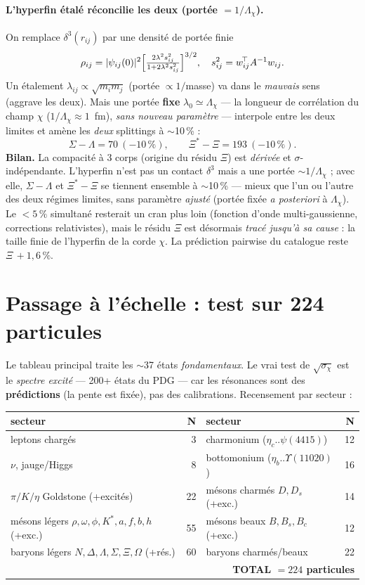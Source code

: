 \documentclass[11pt]{article}
\begin{document}
\paragraph{L'hyperfin étalé réconcilie les deux (portée $=1/\Lambda_\chi$).} On remplace $\delta^3(r_{ij})$ par une densité de portée finie
\[
\rho_{ij}=|\psi_{ij}(0)|^2\Bigl[\tfrac{2\lambda^2 s_{ij}^2}{1+2\lambda^2 s_{ij}^2}\Bigr]^{3/2},\quad s_{ij}^2=w_{ij}^{\!\top}A^{-1}w_{ij}.
\]
Un étalement $\lambda_{ij}\propto\sqrt{m_im_j}$ (portée $\propto1/$masse) va dans le \emph{mauvais} sens (aggrave les deux). Mais une portée \textbf{fixe} $\lambda_0\simeq\Lambda_\chi$ --- la longueur de corrélation du champ $\chi$ ($1/\Lambda_\chi\approx1$~fm), \emph{sans nouveau paramètre} --- interpole entre les deux limites et amène les \emph{deux} splittings à $\sim$10\,\% :
\[
\Sigma{-}\Lambda=70~(-10\,\%),\qquad \Xi^*{-}\Xi=193~(-10\,\%).
\]
\textbf{Bilan.} La compacité à 3 corps (origine du résidu $\Xi$) est \emph{dérivée} et $\sigma$-indépendante. L'hyperfin n'est pas un contact $\delta^3$ mais a une portée $\sim1/\Lambda_\chi$ ; avec elle, $\Sigma{-}\Lambda$ et $\Xi^*{-}\Xi$ se tiennent ensemble à $\sim$10\,\% --- mieux que l'un ou l'autre des deux régimes limites, sans paramètre \emph{ajusté} (portée fixée \emph{a posteriori} à $\Lambda_\chi$). Le $<5\,\%$ simultané resterait un cran plus loin (fonction d'onde multi-gaussienne, corrections relativistes), mais le résidu $\Xi$ est désormais \emph{tracé jusqu'à sa cause} : la taille finie de l'hyperfin de la corde $\chi$. La prédiction pairwise du catalogue reste $\Xi\,{+}1{,}6\,\%$.

\section{Passage à l'échelle : test sur 224 particules}

Le tableau principal traite les $\sim$37 états \emph{fondamentaux}. Le vrai test de $\sqrt{\sigma_\chi}$ est le \emph{spectre excité} --- 200+ états du PDG --- car les résonances sont des \textbf{prédictions} (la pente est fixée), pas des calibrations. Recensement par secteur :

\begin{center}\footnotesize
\begin{tabular}{@{}lr@{\quad}lr@{}}
\toprule
secteur & N & secteur & N \\
\midrule
leptons chargés & 3 & charmonium ($\eta_c$..$\psi(4415)$) & 12 \\
$\nu$, jauge/Higgs & 8 & bottomonium ($\eta_b$..$\Upsilon(11020)$) & 16 \\
$\pi/K/\eta$ Goldstone (+excités) & 22 & mésons charmés $D,D_s$ (+exc.) & 14 \\
mésons légers $\rho,\omega,\phi,K^*,a,f,b,h$ (+exc.) & 55 & mésons beaux $B,B_s,B_c$ (+exc.) & 12 \\
baryons légers $N,\Delta,\Lambda,\Sigma,\Xi,\Omega$ (+rés.) & 60 & baryons charmés/beaux & 22 \\
\midrule
\multicolumn{4}{r}{\textbf{TOTAL $=224$ particules}}\\
\bottomrule
\end{tabular}
\end{center}
\end{document}
